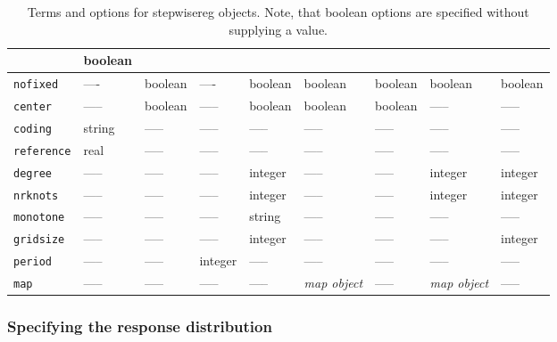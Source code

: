 \begin{sidewaystable}
\begin{tabular}{|l||p{1.5cm}|p{1.5cm}|p{1.5cm}|p{1.5cm}|p{2cm}|p{1.5cm}|p{2cm}|p{2.5cm}|}
                    & boolean \\
\hline
 {\tt nofixed}      & ---- & boolean          & ---- & boolean                       & boolean & boolean & boolean
                    & boolean \\
\hline
 {\tt center}       & -----   & boolean          & ----- & boolean                       & boolean & boolean & -----
                    & ----- \\
\hline
 {\tt coding}       & string  & -----            & -----   & -----                         & -----   & -----   & -----
                    & ----- \\
\hline
 {\tt reference}    & real    & -----            & -----   & -----                         & -----   & -----   & -----
                    & ----- \\
\hline
 {\tt degree}       & -----   & -----            & -----   & integer                       & -----   & -----   & integer
                    & integer \\
\hline
 {\tt nrknots}      & -----   & -----            & -----   & integer                       & -----   & -----   & integer
                    & integer \\
\hline
 {\tt monotone}     & -----   & -----            & -----   & string                        & -----   & -----   & -----
                    & ----- \\
\hline
 {\tt gridsize}     & -----   & -----            & -----   & integer                       & -----   & -----   & -----
                    & integer \\
\hline
 {\tt period}       & -----   & -----            & integer & -----                         & -----   & -----   & -----
                    & ----- \\
\hline
 {\tt map}          & -----   & -----            & -----   & -----                         & {\it map object} & -----   & {\it map object}
                    & ----- \\
\hline
\end{tabular}
{\em\centering \caption{\label{stepwiseregtermsoptions} Terms and options for
stepwisereg objects. Note, that boolean options are specified without supplying a value.}}
\end{sidewaystable}

\clearpage


\subsubsection{Specifying the response distribution}
 \label{stepwiseregfamilysyntax}

